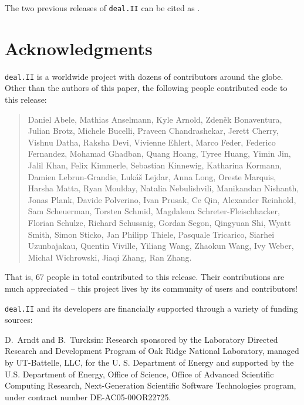\documentclass{ansarticle-preprint}
\newcommand{\specialword}[1]{\texttt{#1}}
\newcommand{\dealii}{{\specialword{deal.II}}\xspace}
\begin{document}
The two previous releases of \dealii can be cited as
\cite{dealii96,dealii97}.


\section{Acknowledgments}

\dealii is a worldwide project with dozens of contributors around the
globe. Other than the authors of this paper, the following people
contributed code to this release:
\begin{quote}
Daniel Abele,
Mathias Anselmann,
Kyle Arnold,
Zdeněk Bonaventura,
Julian Brotz,
Michele Bucelli,
Praveen Chandrashekar,
Jerett Cherry,
Vishnu Datha,
Raksha Devi,
Vivienne Ehlert,
Marco Feder,
Federico Fernandez,
Mohamad Ghadban,
Quang Hoang,
Tyree Huang,
Yimin Jin,
Jalil Khan,
Felix Kimmerle,
Sebastian Kinnewig,
Katharina Kormann,
Damien Lebrun-Grandie,
Lukáš Lejdar,
Anna Long,
Oreste Marquis,
Harsha Matta,
Ryan Moulday,
Natalia Nebulishvili,
Manikandan Nishanth,
Jonas Plank,
Davide Polverino,
Ivan Prusak,
Ce Qin,
Alexander Reinhold,
Sam Scheuerman,
Torsten Schmid,
Magdalena Schreter-Fleischhacker,
Florian Schulze,
Richard Schussnig,
Gordan Segon,
Qingyuan Shi,
Wyatt Smith,
Simon Sticko,
Jan Philipp Thiele,
Pasquale Tricarico,
Siarhei Uzunbajakau,
Quentin Viville,
Yiliang Wang,
Zhaokun Wang,
Ivy Weber,
Michał Wichrowski,
Jiaqi Zhang,
Ran Zhang.
\end{quote}
That is, 67 people in total contributed to this release.
Their contributions are much appreciated -- this project lives by its
community of users and contributors!

\bigskip

\dealii and its developers are financially supported through a
variety of funding sources:

D.~Arndt and B.~Turcksin: Research sponsored by the Laboratory Directed Research and
Development Program of Oak Ridge National Laboratory, managed by UT-Battelle,
LLC, for the U. S. Department of Energy and supported by the U.S. Department of Energy,
Office of Science, Office of Advanced Scientific Computing Research,
Next-Generation Scientific Software Technologies program, under contract
number DE-AC05-00OR22725.
\end{document}
